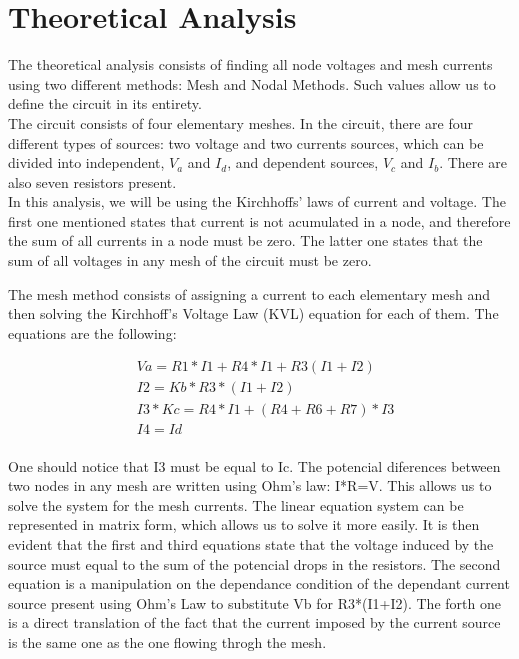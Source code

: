 \section{Theoretical Analysis}
\label{sec:analysis}

\vspace{0.1cm}

The theoretical analysis consists of finding all node voltages and mesh currents using two different methods: Mesh and Nodal Methods. Such values allow us to define the circuit in its entirety.\\

The circuit consists of four elementary meshes. In the circuit, there are four different types of sources: two voltage and two currents sources, which can be divided into independent, $V_a$ and $I_d$, and dependent sources, $V_c$ and $I_b$. There are also seven resistors present.\\
In this analysis, we will be using the Kirchhoffs' laws of current and voltage. The first one mentioned states that current is not acumulated in a node, and therefore the sum of all currents in a node must be zero. The latter one states that the sum of all voltages in any mesh of the circuit must be zero.

\vspace {1cm}
The mesh method consists of assigning a current to each elementary mesh and then solving the Kirchhoff's Voltage Law (KVL) equation for each of them. The equations are the following:

\begin{align*} 
 &Va=R1*I1+R4*I1+R3(I1+I2) \\ &I2 = Kb*R3*(I1+I2) \\
 &I3*Kc=R4*I1+(R4+R6+R7)*I3 \\ &I4=Id \\ 
\end{align*}

 
 \vspace{0.5cm}
One should notice that I3 must be equal to Ic. The potencial diferences between two nodes in any mesh are written using Ohm's law: I*R=V. This allows us to solve the system for the mesh currents. The linear equation system can be represented in matrix form, which allows us to solve it more easily. It is then evident that the first and third equations state that the voltage induced by the source must equal to the sum of the potencial drops in the resistors. The second equation is a manipulation on the dependance condition of the dependant current source present using Ohm's Law to substitute Vb for R3*(I1+I2). The forth one is a direct translation of the fact that the current imposed by the current source is the same one as the one flowing throgh the mesh.











